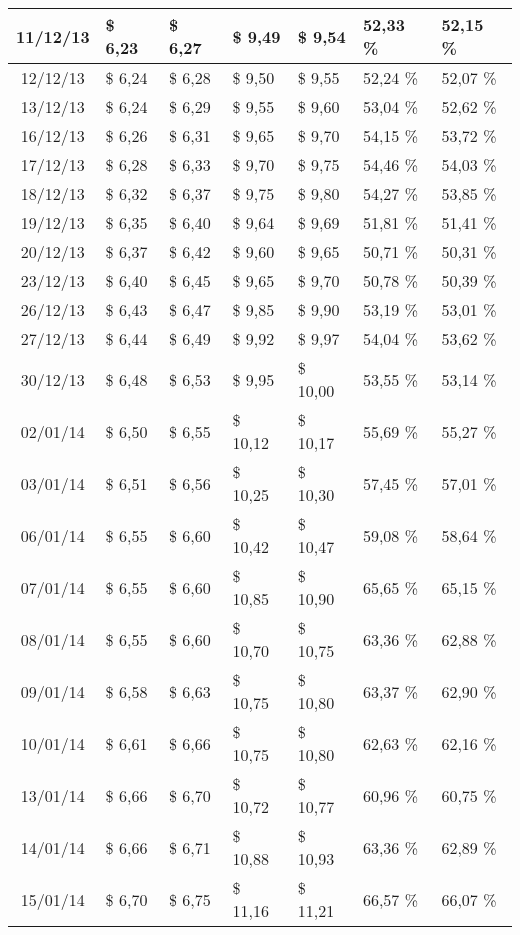 \begin{center}
\begin{longtable}{|c|p{1.5cm}|p{1.5cm}|p{1.5cm}|p{1.5cm}|p{1.5cm}|p{1.5cm}|}
11/12/13 & \$ 6,23 & \$ 6,27 & \$ 9,49 & \$ 9,54 & 52,33 \% & 52,15 \% \\ \hline
12/12/13 & \$ 6,24 & \$ 6,28 & \$ 9,50 & \$ 9,55 & 52,24 \% & 52,07 \% \\ \hline
13/12/13 & \$ 6,24 & \$ 6,29 & \$ 9,55 & \$ 9,60 & 53,04 \% & 52,62 \% \\ \hline
16/12/13 & \$ 6,26 & \$ 6,31 & \$ 9,65 & \$ 9,70 & 54,15 \% & 53,72 \% \\ \hline
17/12/13 & \$ 6,28 & \$ 6,33 & \$ 9,70 & \$ 9,75 & 54,46 \% & 54,03 \% \\ \hline
18/12/13 & \$ 6,32 & \$ 6,37 & \$ 9,75 & \$ 9,80 & 54,27 \% & 53,85 \% \\ \hline
19/12/13 & \$ 6,35 & \$ 6,40 & \$ 9,64 & \$ 9,69 & 51,81 \% & 51,41 \% \\ \hline
20/12/13 & \$ 6,37 & \$ 6,42 & \$ 9,60 & \$ 9,65 & 50,71 \% & 50,31 \% \\ \hline
23/12/13 & \$ 6,40 & \$ 6,45 & \$ 9,65 & \$ 9,70 & 50,78 \% & 50,39 \% \\ \hline
26/12/13 & \$ 6,43 & \$ 6,47 & \$ 9,85 & \$ 9,90 & 53,19 \% & 53,01 \% \\ \hline
27/12/13 & \$ 6,44 & \$ 6,49 & \$ 9,92 & \$ 9,97 & 54,04 \% & 53,62 \% \\ \hline
30/12/13 & \$ 6,48 & \$ 6,53 & \$ 9,95 & \$ 10,00 & 53,55 \% & 53,14 \% \\ \hline
02/01/14 & \$ 6,50 & \$ 6,55 & \$ 10,12 & \$ 10,17 & 55,69 \% & 55,27 \% \\ \hline
03/01/14 & \$ 6,51 & \$ 6,56 & \$ 10,25 & \$ 10,30 & 57,45 \% & 57,01 \% \\ \hline
06/01/14 & \$ 6,55 & \$ 6,60 & \$ 10,42 & \$ 10,47 & 59,08 \% & 58,64 \% \\ \hline
07/01/14 & \$ 6,55 & \$ 6,60 & \$ 10,85 & \$ 10,90 & 65,65 \% & 65,15 \% \\ \hline
08/01/14 & \$ 6,55 & \$ 6,60 & \$ 10,70 & \$ 10,75 & 63,36 \% & 62,88 \% \\ \hline
09/01/14 & \$ 6,58 & \$ 6,63 & \$ 10,75 & \$ 10,80 & 63,37 \% & 62,90 \% \\ \hline
10/01/14 & \$ 6,61 & \$ 6,66 & \$ 10,75 & \$ 10,80 & 62,63 \% & 62,16 \% \\ \hline
13/01/14 & \$ 6,66 & \$ 6,70 & \$ 10,72 & \$ 10,77 & 60,96 \% & 60,75 \% \\ \hline
14/01/14 & \$ 6,66 & \$ 6,71 & \$ 10,88 & \$ 10,93 & 63,36 \% & 62,89 \% \\ \hline
15/01/14 & \$ 6,70 & \$ 6,75 & \$ 11,16 & \$ 11,21 & 66,57 \% & 66,07 \% \\ \hline

\end{longtable}
\end{center}
